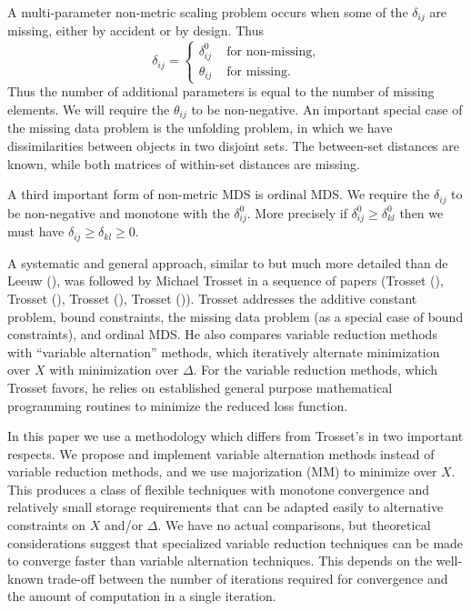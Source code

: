 \documentclass[
  12pt,
  letterpaper,
  DIV=11,
  numbers=noendperiod]{scrartcl}
\begin{document}
A multi-parameter non-metric scaling problem occurs when some of the
\(\delta_{ij}\) are missing, either by accident or by design. Thus
\begin{equation}
\delta_{ij}=\begin{cases}\delta_{ij}^0&\text{ for non-missing},\\
\theta_{ij}&\text{ for missing}.
\end{cases}
\end{equation} Thus the number of additional parameters is equal to the
number of missing elements. We will require the \(\theta_{ij}\) to be
non-negative. An important special case of the missing data problem is
the unfolding problem, in which we have dissimilarities between objects
in two disjoint sets. The between-set distances are known, while both
matrices of within-set distances are missing.

A third important form of non-metric MDS is ordinal MDS. We require the
\(\delta_{ij}\) to be non-negative and monotone with the
\(\delta_{ij}^0\). More precisely if \(\delta_{ij}^0\geq\delta_{kl}^0\)
then we must have \(\delta_{ij}\geq\delta_{kl}\geq 0\).

A systematic and general approach, similar to but much more detailed
than {de Leeuw} (), was followed by
Michael Trosset in a sequence of papers (Trosset
(), Trosset
(), Trosset
(), Trosset
()). Trosset addresses the additive
constant problem, bound constraints, the missing data problem (as a
special case of bound constraints), and ordinal MDS. He also compares
variable reduction methods with ``variable alternation'' methods, which
iteratively alternate minimization over \(X\) with minimization over
\(\Delta\). For the variable reduction methods, which Trosset favors, he
relies on established general purpose mathematical programming routines
to minimize the reduced loss function.

In this paper we use a methodology which differs from Trosset's in two
important respects. We propose and implement variable alternation
methods instead of variable reduction methods, and we use majorization
(MM) to minimize over \(X\). This produces a class of flexible
techniques with monotone convergence and relatively small storage
requirements that can be adapted easily to alternative constraints on
\(X\) and/or \(\Delta\). We have no actual comparisons, but theoretical
considerations suggest that specialized variable reduction techniques
can be made to converge faster than variable alternation techniques.
This depends on the well-known trade-off between the number of
iterations required for convergence and the amount of computation in a
single iteration.
\end{document}
